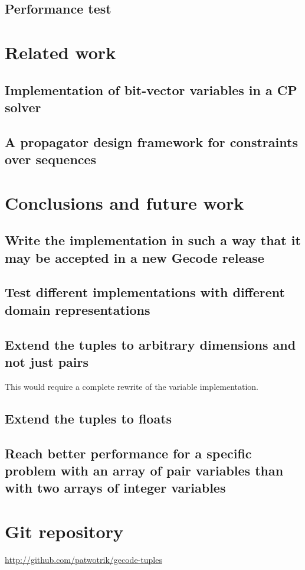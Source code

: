 \documentclass[a4paper,11pt]{article}
\begin{document}
\subsection{Performance test}

\section{Related work}
\subsection{Implementation of bit-vector variables in a CP solver}
\subsection{A propagator design framework for constraints over sequences}

\section{Conclusions and future work}

\subsection{Write the implementation in such a way that it may be accepted in a new Gecode release}
\subsection{Test different implementations with different domain representations}
\subsection{Extend the tuples to arbitrary dimensions and not just pairs}
This would require a complete rewrite of the variable implementation.
\subsection{Extend the tuples to floats}
\subsection{Reach better performance for a specific problem with an array of pair variables than with two arrays of integer variables}

\section{Git repository}
\url{http://github.com/patwotrik/gecode-tuples}
\end{document}

